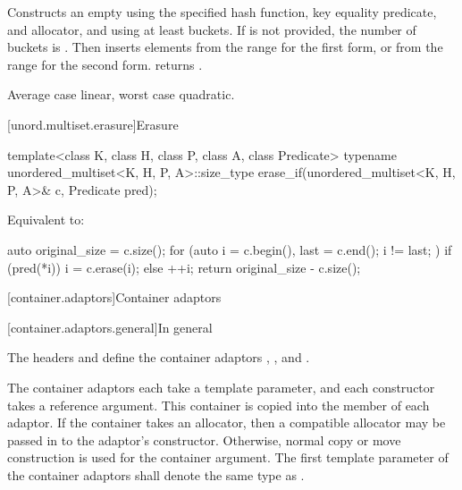 \begin{itemdescr}
\pnum
\effects
Constructs an empty  using the
specified hash function, key equality predicate, and allocator, and
using at least  buckets. If  is not
provided, the number of buckets is . Then
inserts elements from the range 
for the first form, or from the range
 for the second form.
 returns .

\pnum
\complexity
Average case linear, worst case quadratic.
\end{itemdescr}

[unord.multiset.erasure]{Erasure}

%
\begin{itemdecl}
template<class K, class H, class P, class A, class Predicate>
  typename unordered_multiset<K, H, P, A>::size_type
    erase_if(unordered_multiset<K, H, P, A>& c, Predicate pred);
\end{itemdecl}

\begin{itemdescr}
\pnum
\effects
Equivalent to:
\begin{codeblock}
auto original_size = c.size();
for (auto i = c.begin(), last = c.end(); i != last; ) {
  if (pred(*i)) {
    i = c.erase(i);
  } else {
    ++i;
  }
}
return original_size - c.size();
\end{codeblock}
\end{itemdescr}

[container.adaptors]{Container adaptors}

[container.adaptors.general]{In general}

\pnum
The headers  and  define the container adaptors
, , and .

\pnum
The container adaptors each take a  template parameter, and each constructor takes
a  reference argument. This container is copied into the  member
of each adaptor. If the container takes an allocator, then a compatible allocator may be passed in
to the adaptor's constructor. Otherwise, normal copy or move construction is used for the container
argument.
The first template parameter  of the container adaptors
shall denote the same type as .

